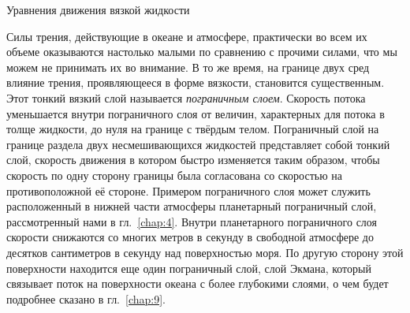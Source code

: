 
\begin{chapter}{Уравнения движения вязкой жидкости}\label{chap:8}

Силы трения, действующие в океане и атмосфере, практически во всем их объеме
оказываются настолько малыми по сравнению с прочими силами, что мы можем 
не принимать их во внимание. В то же время, на границе двух сред влияние трения, 
проявляющееся в форме вязкости, становится существенным.
Этот тонкий вязкий слой называется 
\emph{пограничным слоем}. Скорость потока 
уменьшается внутри пограничного слоя от величин, характерных для потока в
толще жидкости, до нуля на границе с твёрдым телом. Пограничный слой 
на границе раздела двух несмешивающихся жидкостей представляет собой 
тонкий слой, скорость движения в котором быстро изменяется таким образом, 
чтобы скорость по одну сторону границы была согласована со скоростью на 
противоположной её стороне. Примером пограничного слоя может служить
расположенный в нижней части атмосферы планетарный пограничный слой, 
рассмотренный нами в гл.~\ref{chap:4}.
Внутри планетарного пограничного слоя скорости снижаются со многих
метров в секунду в свободной атмосфере до десятков сантиметров в
секунду над поверхностью моря. По другую сторону этой поверхности находится
еще один пограничный слой, слой Экмана, который 
связывает поток на поверхности океана с более глубокими слоями,
о чем будет подробнее сказано в гл.~\ref{chap:9}.
%


\end{chapter}
